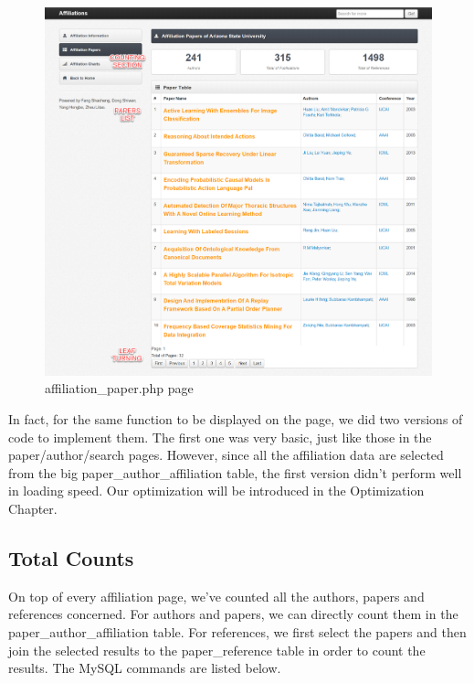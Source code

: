 \documentclass{book}
\begin{document}
\begin{figure}[H]
\centering
\includegraphics[scale=0.35]{img/zlt_aff_demo2.png}
\caption{affiliation\_paper.php page}
\end{figure}

In fact, for the same function to be displayed on the page, we did two versions of code to implement them. The first one was very basic, just like those in the paper/author/search pages. However, since all the affiliation data are selected from the big paper\_author\_affiliation table, the first version didn't perform well in loading speed. Our optimization will be introduced in the Optimization Chapter.



\subsection {Total Counts}
On top of every affiliation page, we've counted all the authors, papers and references concerned. For authors and papers, we can directly count them in the paper\_author\_affiliation table. For references, we first select the papers and then join the selected results to the paper\_reference table in order to count the results. The MySQL commands are listed below.
\end{document}
